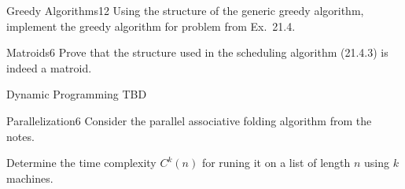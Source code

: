 \documentclass[a4paper]{article}
\begin{document}
\header

\begin{problem}{Greedy Algorithms}{12}
Using the structure of the generic greedy algorithm, implement the greedy algorithm for problem from Ex.~21.4.
%
%
\end{problem}

\begin{problem}{Matroids}{6}
Prove that the structure used in the scheduling algorithm (21.4.3) is indeed a matroid.
\end{problem}



\begin{problem}{Dynamic Programming}{}
TBD
\end{problem}

\begin{problem}{Parallelization}{6}
Consider the parallel associative folding algorithm from the notes.

Determine the time complexity $C^k(n)$ for runing it on a list of length $n$ using $k$ machines.
\end{problem}
\end{document}
